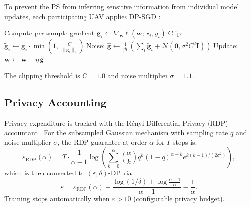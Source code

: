 \documentclass[12pt,a4paper]{article}
\begin{document}
To prevent the PS from inferring sensitive information from individual model
updates, each participating UAV applies DP-SGD \cite{abadi2016}:

\begin{algorithm}[H]
\caption{DP-SGD at UAV $k$, round $t$}
\begin{algorithmic}[1]
      \State Compute per-sample gradient $\mathbf{g}_i \leftarrow \nabla_{\mathbf{w}} \ell(\mathbf{w}; x_i, y_i)$
      \State Clip: $\tilde{\mathbf{g}}_i \leftarrow \mathbf{g}_i \cdot \min\!\left(1,\, \tfrac{C}{\|\mathbf{g}_i\|_2}\right)$
    \EndFor
    \State Noise: $\hat{\mathbf{g}} \leftarrow \tfrac{1}{|\mathcal{B}|}\!\left(\sum_i \tilde{\mathbf{g}}_i + \mathcal{N}(\mathbf{0}, \sigma^2 C^2 \mathbf{I})\right)$
    \State Update: $\mathbf{w} \leftarrow \mathbf{w} - \eta\, \hat{\mathbf{g}}$
  \EndFor
\EndFor
\end{algorithmic}
\end{algorithm}

The clipping threshold is $C = 1.0$ and noise multiplier $\sigma = 1.1$.

\subsection{Privacy Accounting}

Privacy expenditure is tracked with the R\'enyi Differential Privacy (RDP)
accountant \cite{mironov2017,wang2019}.  For the subsampled Gaussian mechanism with
sampling rate $q$ and noise multiplier $\sigma$, the RDP guarantee at order $\alpha$
for $T$ steps is:
\begin{equation}
  \varepsilon_{\mathrm{RDP}}(\alpha) = T \cdot
  \frac{1}{\alpha-1} \log\!\left(
    \sum_{k=0}^{\alpha} \binom{\alpha}{k} q^k (1-q)^{\alpha-k}
    e^{k(k-1)/(2\sigma^2)}
  \right),
  \label{eq:rdp}
\end{equation}
which is then converted to $(\varepsilon,\delta)$-DP via \cite{balle2020}:
\begin{equation}
  \varepsilon = \varepsilon_{\mathrm{RDP}}(\alpha) +
  \frac{\log(1/\delta) + \log\frac{\alpha-1}{\alpha}}{\alpha-1} -
  \frac{1}{\alpha}.
  \label{eq:rdp2dp}
\end{equation}
Training stops automatically when $\varepsilon > 10$ (configurable privacy budget).

\end{document}
